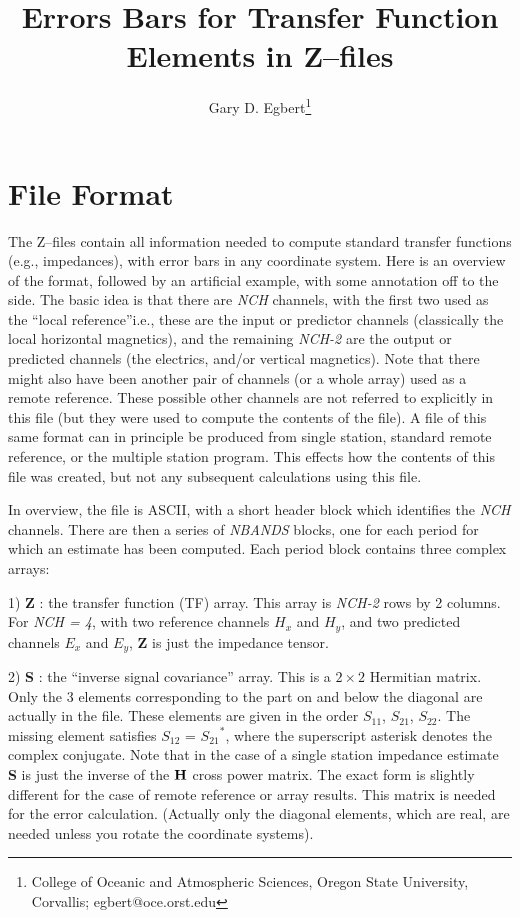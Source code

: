 \setlength{\textheight}{23cm}
\setlength{\textwidth}{16cm}
\setlength{\oddsidemargin}{0.25in}
\setlength{\topmargin}{-0.5in}
\title{Errors Bars for Transfer Function Elements in Z--files}
\author{Gary D. Egbert\thanks{College of Oceanic and Atmospheric Sciences, Oregon State University, Corvallis; egbert@oce.orst.edu}}



\maketitle

\section{File Format}

The Z--files contain all information needed to compute standard
transfer functions (e.g., impedances), with error bars in any coordinate
system.  Here is an overview of the format, followed by an
artificial example, with some annotation off to the side.
The basic idea is that there are {\it NCH} channels, with the first
two used as the ``local reference''i.e., these are the input
or predictor channels (classically the local horizontal  magnetics), and
the remaining {\it NCH-2} are the output or predicted channels (the electrics,
and/or vertical magnetics).  Note that there might also have been
another pair of channels (or a whole array) used as a remote reference.
These possible other channels are not referred to explicitly in this
file (but they were used to compute the contents of the file).  A
file of this same format can in principle be produced from single
station, standard remote reference, or the multiple station program.
This effects how the contents of this file was created, but not
any subsequent calculations using this file.

In overview, the file is ASCII, with a short header block
which identifies the {\it NCH} channels.
There are then a series of {\it NBANDS} blocks,
one for each period for which an estimate has been computed.
Each period block contains three complex arrays:

1) {\bf Z} : the transfer function (TF) array.  This array is {\it NCH-2} rows
by 2 columns.  For {\it NCH = 4},
with two reference channels $H_x$ and $H_y$,
and two predicted channels $E_x$ and $E_y$, {\bf Z} is just the impedance
tensor.

2) {\bf S} : the ``inverse signal covariance'' array.  This is a $2 \times 2$
Hermitian matrix.  Only the 3 elements corresponding to the part
on and below the diagonal are actually in the file.  These elements
are given in the order $S_{11}$, $S_{21}$, $S_{22}$.  The missing element
satisfies $S_{12}$ = ${S_{21}}^*$, where the superscript asterisk denotes
the complex conjugate.  Note that in the case of a single station
impedance estimate {\bf S} is just the inverse of the ${\bf H}$ cross power
matrix.  The exact form is slightly different for the case of remote reference
or array results.  This matrix is needed for the error calculation.
(Actually only the diagonal elements, which are real,
are needed unless you rotate the coordinate systems).

